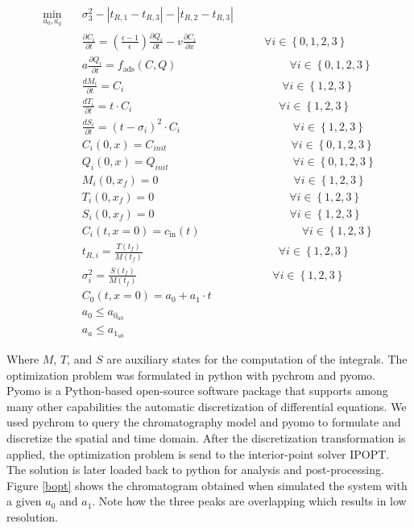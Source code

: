 \documentclass[paper=a4, fontsize=11pt]{scrartcl}
\begin{document}
\begin{align}
\label{opt}
\min_{a_0, a_q} \quad & \sigma_3^{2}-|t_{R,1}-t_{R,3}|-|t_{R,2}-t_{R,3}| \\
& \frac{\partial C_i}{\partial t} = \left(\frac{\epsilon-1}{\epsilon}\right) \frac{\partial Q_i}{\partial t}-v\frac{\partial C_i}{\partial x}   \qquad \qquad \qquad \forall i \in \left\{0,1,2,3\right\}\\
& a \frac{\partial Q_i}{\partial t} = f_{\text{ads}}(C,Q) \qquad \qquad \qquad \qquad \qquad \forall i \in \left\{0,1,2,3\right\} \\
& \frac{dM_{i}}{\partial t} = C_i\qquad \qquad \qquad \qquad \qquad \qquad \qquad \forall i \in \left\{1,2,3\right\}\\
& \frac{dT_{i}}{\partial t} = t \cdot C_i\qquad \qquad \qquad \qquad \quad\qquad \qquad \forall i \in \left\{1,2,3\right\}\\
& \frac{dS_{i}}{\partial t} = (t-\sigma_i)^2 \cdot C_i\qquad \qquad \qquad \qquad \qquad \forall i \in \left\{1,2,3\right\}\\
&C_i(0,x) = C_{init} \qquad \quad \qquad \qquad \qquad \qquad \forall i \in \left\{0,1,2,3\right\}\\
&Q_i(0,x) = Q_{init} \qquad \quad \qquad \qquad \qquad \qquad \forall i \in \left\{0, 1,2,3\right\}\\
&M_i(0,x_f) = 0 \qquad \qquad \qquad \qquad \qquad \qquad \forall i \in \left\{1,2,3\right\}\\
&T_i(0,x_f) = 0 \qquad \qquad \qquad \qquad \qquad \qquad \forall i \in \left\{1,2,3\right\}\\
&S_i(0,x_f) = 0 \qquad \qquad \qquad \qquad \qquad \qquad \forall i \in \left\{1,2,3\right\}\\
&C_i(t,x=0) = c_{\text{in}}(t) \qquad \quad \qquad \qquad \qquad \forall i \in \left\{1,2,3\right\}\\
&t_{R,i}= \frac{T(t_f)}{M(t_f)} \qquad \qquad \qquad \qquad \qquad \qquad \forall i \in \left\{1,2,3\right\}\\
&\sigma_{i}^2= \frac{S(t_f)}{M(t_f)} \qquad \qquad \qquad \qquad \qquad \qquad \forall i \in \left\{1,2,3\right\}\\
&C_0(t,x=0) = a_0 +a_1\cdot t \\
&a_0 \leq a_{0_{ub}} \\
&a_a \leq a_{1_{ub}}  
\end{align}

Where $M$, $T$, and $S$ are auxiliary states for the computation of the integrals. The optimization problem was formulated in python with pychrom and pyomo. Pyomo is a Python-based open-source software package that supports among many other capabilities the automatic discretization of differential equations. We used pychrom to query the chromatography model and pyomo to formulate and discretize the spatial and time domain. After the discretization transformation is applied, the optimization problem is send to the interior-point solver IPOPT. The solution is later loaded back to python for analysis and post-processing. Figure \ref{bopt} shows the chromatogram obtained when simulated the system with a given $a_0$ and $a_1$. Note how the three peaks are overlapping which results in low resolution.
 
\end{document}
